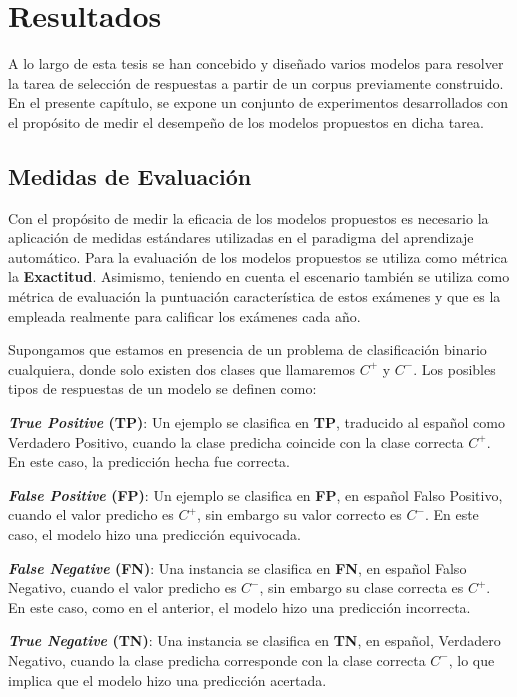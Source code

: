 \chapter{Resultados}\label{chapter:results}

A lo largo de esta tesis se han concebido y diseñado varios modelos para resolver la tarea de selección de respuestas a partir de un corpus previamente construido. En el presente capítulo, se expone un conjunto de experimentos desarrollados con el propósito de medir el desempeño de los modelos propuestos en dicha tarea.

\section{Medidas de Evaluación}

Con el propósito de medir la eficacia de los modelos propuestos es necesario la aplicación de medidas estándares utilizadas en el paradigma del aprendizaje automático. Para la evaluación de los modelos propuestos se utiliza como métrica la \textbf{Exactitud}. Asimismo, teniendo en cuenta el escenario también se utiliza como métrica de evaluación la puntuación característica de estos exámenes y que es la empleada realmente para calificar los exámenes cada año.

Supongamos que estamos en presencia de un problema de clasificación binario cualquiera, donde solo existen dos clases que llamaremos $C^{+}$ y $C^{-}$. Los posibles tipos de respuestas de un modelo se definen como:

\begin{description}
  \item \textbf{\textit{True Positive} (TP)}: Un ejemplo se clasifica en \textbf{TP}, traducido al español como Verdadero Positivo, cuando la clase predicha coincide con la clase correcta $C^{+}$. En este caso, la predicción hecha fue correcta.
  \item \textbf{\textit{False Positive} (FP)}: Un ejemplo se clasifica en \textbf{FP}, en español Falso Positivo, cuando el valor predicho es $C^{+}$, sin embargo su valor correcto es $C^{-}$. En este caso, el modelo hizo una predicción equivocada.
  \item \textbf{\textit{False Negative} (FN)}: Una instancia se clasifica en \textbf{FN}, en español Falso Negativo, cuando el valor predicho es $C^{-}$, sin embargo su clase correcta es $C^{+}$. En este caso, como en el anterior, el modelo hizo una predicción incorrecta.
  \item \textbf{\textit{True Negative} (TN)}: Una instancia se clasifica en \textbf{TN}, en español, Verdadero Negativo, cuando la clase predicha corresponde con la clase correcta $C^{-}$, lo que implica que el modelo hizo una predicción acertada.
\end{description}

